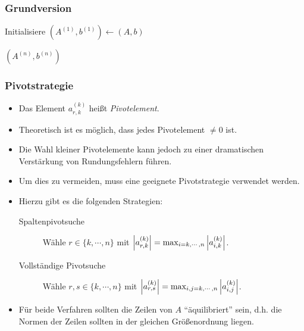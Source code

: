 			\subsubsection{Grundversion}
				\begin{algorithm}[H]
					Initialisiere \( (A^{(1)}, b^{(1)}) \gets (A, b) \)


					\Return \( (A^{(n)}, b^{(n)}) \)
				\end{algorithm}

			\subsubsection{Pivotstrategie}
				\begin{itemize}
					\item Das Element \( a_{r,k}^{(k)} \) heißt \textit{Pivotelement}.
					\item Theoretisch ist es möglich, dass jedes Pivotelement \( \neq 0 \) ist.
					\item Die Wahl kleiner Pivotelemente kann jedoch zu einer dramatischen Verstärkung von Rundungsfehlern führen.
					\item Um dies zu vermeiden, muss eine geeignete Pivotstrategie verwendet werden.
					\item Hierzu gibt es die folgenden Strategien:
						\begin{description}
							\item[Spaltenpivotsuche] Wähle \( r \in \{ k, \cdots, n \} \) mit \( \abs{a_{r,k}^{(k)}} = \max_{i = k, \cdots, n} \abs{a_{i,k}^{(k)}} \).
							\item[Vollständige Pivotsuche] Wähle \( r, s \in \{ k, \cdots, n \} \) mit \( \abs{a_{r,s}^{(k)}} = \max_{i, j = k, \cdots, n} \abs{a_{i,j}^{(k)}} \).
						\end{description}
					\item Für beide Verfahren sollten die Zeilen von \(A\) \enquote{äquilibriert} sein, d.h. die Normen der Zeilen sollten in der gleichen Größenordnung liegen.
				\end{itemize}

